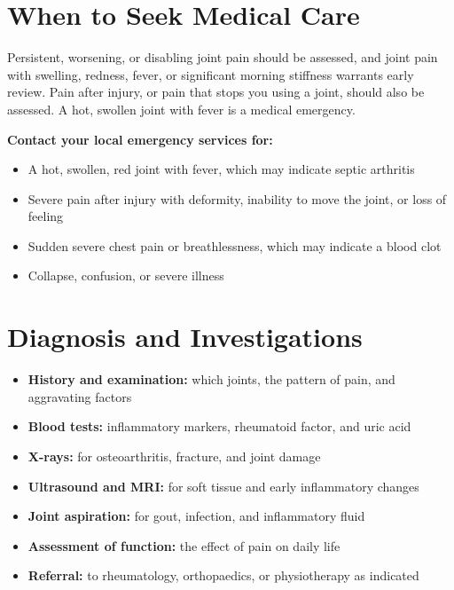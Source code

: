 \section*{When to Seek Medical Care}
Persistent, worsening, or disabling joint pain should be assessed, and joint pain with swelling, redness, fever, or significant morning stiffness warrants early review. Pain after injury, or pain that stops you using a joint, should also be assessed. A hot, swollen joint with fever is a medical emergency.

\textbf{Contact your local emergency services for:}
\begin{itemize}
    \item A hot, swollen, red joint with fever, which may indicate septic arthritis
    \item Severe pain after injury with deformity, inability to move the joint, or loss of feeling
    \item Sudden severe chest pain or breathlessness, which may indicate a blood clot
    \item Collapse, confusion, or severe illness
\end{itemize}

\section*{Diagnosis and Investigations}
\begin{itemize}
    \item \textbf{History and examination:} which joints, the pattern of pain, and aggravating factors
    \item \textbf{Blood tests:} inflammatory markers, rheumatoid factor, and uric acid
    \item \textbf{X-rays:} for osteoarthritis, fracture, and joint damage
    \item \textbf{Ultrasound and MRI:} for soft tissue and early inflammatory changes
    \item \textbf{Joint aspiration:} for gout, infection, and inflammatory fluid
    \item \textbf{Assessment of function:} the effect of pain on daily life
    \item \textbf{Referral:} to rheumatology, orthopaedics, or physiotherapy as indicated
\end{itemize}


